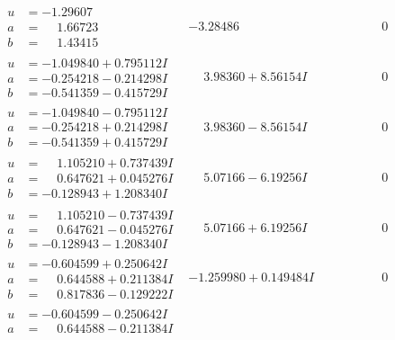 \documentclass[1p]{elsarticle_modified}
\theoremstyle{definition}
\begin{document}
$$\begin{array}{c|c|c}
 \hline 
\begin{aligned}
u &= -1.29607\phantom{ +0.000000I} \\
a &= \phantom{-}1.66723\phantom{ +0.000000I} \\
b &= \phantom{-}1.43415\phantom{ +0.000000I}\end{aligned}
 & -3.28486\phantom{ +0.000000I} & \phantom{-0.000000 } 0 \\ \hline\begin{aligned}
u &= -1.049840 + 0.795112 I \\
a &= -0.254218 - 0.214298 I \\
b &= -0.541359 - 0.415729 I\end{aligned}
 & \phantom{-}3.98360 + 8.56154 I & \phantom{-0.000000 } 0 \\ \hline\begin{aligned}
u &= -1.049840 - 0.795112 I \\
a &= -0.254218 + 0.214298 I \\
b &= -0.541359 + 0.415729 I\end{aligned}
 & \phantom{-}3.98360 - 8.56154 I & \phantom{-0.000000 } 0 \\ \hline\begin{aligned}
u &= \phantom{-}1.105210 + 0.737439 I \\
a &= \phantom{-}0.647621 + 0.045276 I \\
b &= -0.128943 + 1.208340 I\end{aligned}
 & \phantom{-}5.07166 - 6.19256 I & \phantom{-0.000000 } 0 \\ \hline\begin{aligned}
u &= \phantom{-}1.105210 - 0.737439 I \\
a &= \phantom{-}0.647621 - 0.045276 I \\
b &= -0.128943 - 1.208340 I\end{aligned}
 & \phantom{-}5.07166 + 6.19256 I & \phantom{-0.000000 } 0 \\ \hline\begin{aligned}
u &= -0.604599 + 0.250642 I \\
a &= \phantom{-}0.644588 + 0.211384 I \\
b &= \phantom{-}0.817836 - 0.129222 I\end{aligned}
 & -1.259980 + 0.149484 I & \phantom{-0.000000 } 0 \\ \hline\begin{aligned}
u &= -0.604599 - 0.250642 I \\
a &= \phantom{-}0.644588 - 0.211384 I \\

\end{aligned}
\end{array}$$
\end{document}
